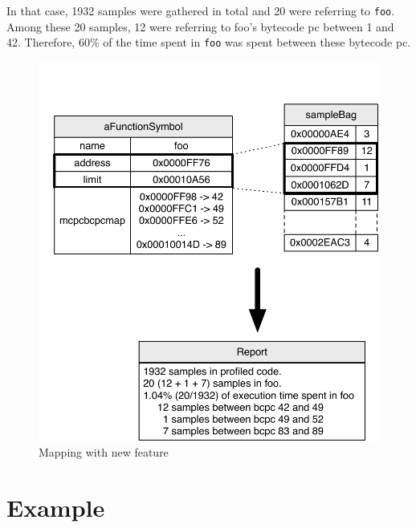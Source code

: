 \documentclass[10pt,preprint,nonatbib]{sigplanconf}
\newcommand{\ct}{\lstinline[backgroundcolor=\color{white},basicstyle=\small\ttfamily]}
\begin{document}
In that case, 1932 samples were gathered in total and 20 were referring to \ct{foo}. Among these 20 samples, 12 were referring to foo's bytecode pc between 1 and 42. Therefore, 60\% of the time spent in \ct{foo} was spent between these bytecode pc.


 \begin{figure}[!htp]
     \begin{center}
         \includegraphics[width=1.0\linewidth]{NewMapping}
         \caption{Mapping with new feature}
         \label{fig:NewMapping}
     \end{center}
 \end{figure}
 

\section{Example}
\end{document}
